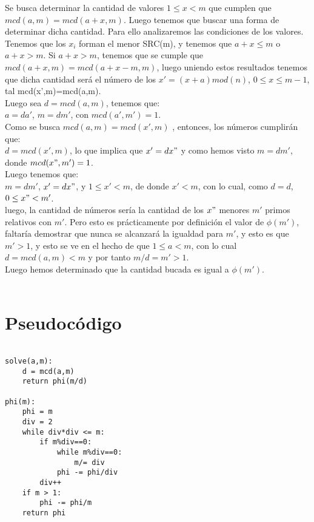 \documentclass[12pt]{article}
\begin{document}
 Se busca determinar la cantidad de valores $1\leq x< m$ que cumplen que $mcd(a,m)=mcd(a+x,m)$. Luego tenemos que buscar una forma de
 determinar dicha cantidad. Para ello analizaremos las condiciones de los valores. Tenemos que los $x_i$ forman el menor SRC(m), y tenemos que
 $a+x\leq m$ o $a+x>m$. Si $a+x>m$, tenemos que se cumple que $mcd(a+x,m)=mcd(a+x-m,m)$, luego uniendo estos resultados tenemos que dicha 
 cantidad ser\'a el n\'umero de los $x'= (x+a)mod(n)$, $0\leq x\leq m-1$, tal mcd(x',m)=mcd(a,m).\\
 Luego sea $d = mcd(a,m)$, tenemos que:\\
 $a = da'$, $m = dm'$, con $mcd(a',m') = 1$.\\
 Como se busca $mcd(a,m)=mcd(x',m)$ , entonces, los n\'umeros cumplir\'an que:\\
 $d = mcd(x',m)$, lo que implica que $x'= dx"$ y como hemos visto $m= dm'$, donde $mcd(x",m')=1$.\\
 Luego tenemos que: \\
 $m=dm'$, $x'=dx"$, y $1\leq x'<m$, de donde $x'<m$, con lo cual, como $d=d$, $0\leq x"<m'$.\\
 luego, la cantidad de n\'umeros ser\'ia la cantidad de los $x"$ menores $m'$ primos relativos con $m'$. Pero esto es pr\'acticamente por definici\'on el valor de $\phi(m')$, faltar\'ia demostrar que nunca se alcanzar\'a la igualdad para $m'$, y esto es que $m'>1$, y esto se ve
 en el hecho de que $1\leq a<m$, con lo cual $d=mcd(a,m)<m$ y por tanto $m/d = m'>1 $.\\
 Luego hemos determinado que la cantidad bucada es igual a $\phi(m')$.\\
 \\

\newpage

\section{Pseudocódigo}


\begin{verbatim}

solve(a,m):
    d = mcd(a,m)
    return phi(m/d)

phi(m):
    phi = m
    div = 2
    while div*div <= m:
        if m%div==0:
            while m%div==0:
                m/= div
            phi -= phi/div
        div++
    if m > 1:
        phi -= phi/m
    return phi
    
\end{verbatim}
\end{document}
